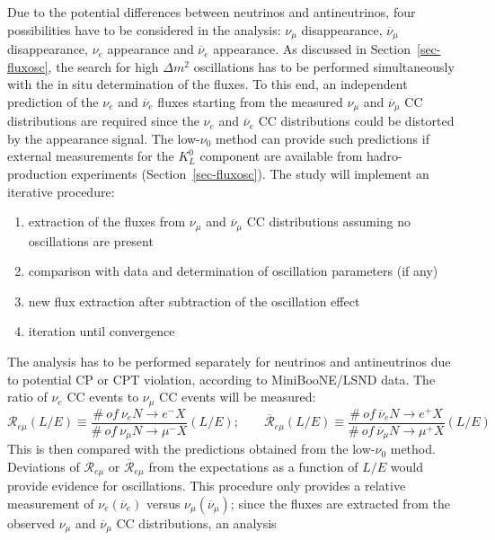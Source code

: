 Due to the potential differences between neutrinos and antineutrinos,
four possibilities have to be considered in the analysis: $\nu_\mu$
disappearance, $\overline{\nu}_\mu$ disappearance, $\nu_e$ appearance and
$\overline{\nu}_e$ appearance. As discussed in Section~\ref{sec-fluxosc},
the search for high $\Delta m^2$ oscillations has to be performed
simultaneously with the in situ determination of the fluxes.
To this end, an independent prediction of the $\nu_e$ and
$\overline{\nu}_e$ fluxes starting from the measured $\nu_\mu$ and $\overline{\nu}_\mu$ CC distributions are required since the $\nu_e$ and $\overline{\nu}_e$ CC distributions could
be distorted by the appearance signal. The low-$\nu_0$ method can provide
such predictions if external measurements for the $K_L^0$ component
are available from hadro-production experiments (Section~\ref{sec-fluxosc}). 
The study will implement an iterative procedure:
\begin{enumerate}%
\item extraction of the fluxes from $\nu_\mu$ and $\overline{\nu}_\mu$ CC distributions assuming
no oscillations are present
\item comparison with data and determination of oscillation parameters (if any)
\item new flux extraction after subtraction of the oscillation effect
\item iteration until convergence
\end{enumerate}
The analysis has to be performed separately for neutrinos and antineutrinos due to
potential CP or CPT violation, according to MiniBooNE/LSND data.
The ratio of $\nu_e$ CC events to $\nu_\mu$ CC events will be measured: 
\begin{equation}
{\mathcal{R}}_{e \mu} (L/E)  \equiv  \frac{\#~of~\nu_e N \to e^- X}{\#~of~\nu_\mu N \to \mu^- X }(L/E); \;\;\;\;\;\;\;  \overline{\mathcal{R}}_{e \mu} (L/E) \equiv \frac{\#~of~\overline{\nu}_e N \to e^+ X}{\#~of~\overline{\nu}_\mu N \to \mu^+ X }(L/E)
\end{equation}
This is then compared with the predictions obtained from the low-$\nu_0$ method.
Deviations of ${\mathcal{R}}_{e \mu}$ or $\overline{\mathcal{R}}_{e \mu}$ from the expectations
as a function of $L/E$ would provide evidence for oscillations. %
This procedure only provides a relative measurement of $\nu_e (\overline{\nu}_e)$
versus $\nu_\mu (\overline{\nu}_\mu)$; since the fluxes
are extracted from the observed $\nu_\mu$ and $\overline{\nu}_\mu$ CC distributions, an analysis
